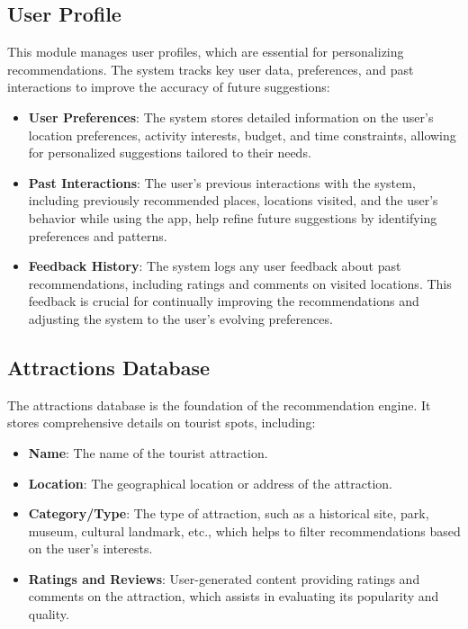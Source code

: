 \subsection{User Profile}
This module manages user profiles, which are essential for personalizing recommendations. The system tracks key user data, preferences, and past interactions to improve the accuracy of future suggestions:
\begin{itemize}
    \item \textbf{User Preferences}: The system stores detailed information on the user’s location preferences, activity interests, budget, and time constraints, allowing for personalized suggestions tailored to their needs.
    \item \textbf{Past Interactions}: The user’s previous interactions with the system, including previously recommended places, locations visited, and the user’s behavior while using the app, help refine future suggestions by identifying preferences and patterns.
    \item \textbf{Feedback History}: The system logs any user feedback about past recommendations, including ratings and comments on visited locations. This feedback is crucial for continually improving the recommendations and adjusting the system to the user’s evolving preferences.
\end{itemize}

\subsection{Attractions Database}
The attractions database is the foundation of the recommendation engine. It stores comprehensive details on tourist spots, including:
\begin{itemize}
    \item \textbf{Name}: The name of the tourist attraction.
    \item \textbf{Location}: The geographical location or address of the attraction.
    \item \textbf{Category/Type}: The type of attraction, such as a historical site, park, museum, cultural landmark, etc., which helps to filter recommendations based on the user’s interests.
    \item \textbf{Ratings and Reviews}: User-generated content providing ratings and comments on the attraction, which assists in evaluating its popularity and quality.
\end{itemize}


